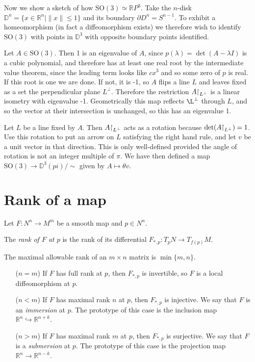 Now we show a sketch of how $\mathrm{SO}(3) \simeq \mathbb{R}P^3$.
Take the $n$-disk
$\mathbb{D}^n = \{ x \in \mathbb{R}^n \vert \| x \| \leq 1 \}$ and its
boundary $\partial D^n = S^{n-1}$. To exhibit a homeomorphism (in fact
a diffeomorphism exists) we therefore wish to identify
$\mathrm{SO}(3)$ with points in $\mathbb{D}^3$ with opposite boundary
points identified.

Let $A \in \mathrm{SO}(3)$. Then 1 is an eigenvalue of $A$, since
$p(\lambda) = \det(A - \lambda I)$ is a cubic polynomial, and
therefore has at least one real root by the intermediate value
theorem, since the leading term looks like $cx^3$ and so some zero of
$p$ is real. If this root is one we are done. If not, it is -1, so
$A$ flips a line $L$ and leaves fixed as a set the perpendicular plane
$L^\perp$. Therefore the restriction $A\mathord{\upharpoonright}_{L^\perp}$ is a
linear isometry with eigenvalue -1. Geometrically this map reflects
$\L^\perp$ through $L$, and so the vector at their intersection is
unchanged, so this has an eigenvalue 1.

Let $L$ be a line fixed by $A$. Then $A\mathord{\upharpoonright}_{L^\perp}$ acts as a
rotation because $\det(A\mathord{\upharpoonright}_{L^\perp}) = 1$. Use this rotation
to put an arrow on $L$ satisfying the right hand rule, and let $v$ be
a unit vector in that direction. This is only well-defined provided
the angle of rotation is not an integer multiple of $\pi$. We have
then defined a map $\mathrm{SO}(3) \to \mathbb{D}^3(pi) / \sim$ given
by
$A \mapsto \theta v$.

\section{Rank of a map}
Let $F: N^n \to M^m$ be a smooth map and $p \in N^n$.
\begin{defn}[Rank]
The \emph{rank of $F$ at $p$} is the rank of its differential
$F_{\ast,p} : T_pN \to T_{f(p)}M$.
\end{defn}

The maximal allowable rank of an
$m \times n$ matrix is $\min\{m, n\}$.
\begin{itemize}
  \item[($n = m$)]{
    If $F$ has full rank at $p$, then $F_{\ast,p}$ is invertible, so
    $F$ is a local diffeomorphism at $p$.
  }
  \item[($n < m$)]{
    If $F$ has maximal rank $n$ at $p$, then $F_{\ast,p}$ is injective. We
    say that $F$ is an \emph{immersion} at $p$. The prototype of this
    case is the inclusion map $\mathbb{R}^n \hookrightarrow \mathbb{R}^{n+k}$.
  }
  \item[($n > m$)]{
    If $F$ has maximal rank $m$ at $p$, then $F_{\ast, p}$ is
    surjective. We say that $F$ is a \emph{submersion} at $p$. The
    prototype of this case is the projection map
    $\mathbb{R}^n \to \mathbb{R}^{n-k}$.
  }
\end{itemize}

